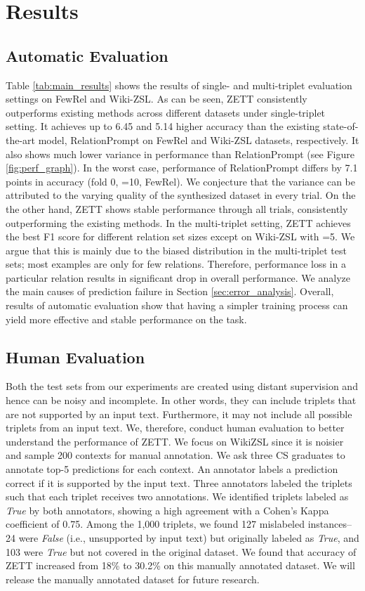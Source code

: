 \section{Results}
\subsection{Automatic Evaluation}
\label{sec:main_results}
Table \ref{tab:main_results} shows the results of single- and multi-triplet evaluation settings on FewRel and Wiki-ZSL. As can be seen, ZETT consistently outperforms existing methods across different datasets under single-triplet setting. It achieves up to 6.45 and 5.14 higher accuracy than the existing state-of-the-art model, RelationPrompt on FewRel and Wiki-ZSL datasets, respectively. It also shows much lower variance in performance than RelationPrompt (see Figure \ref{fig:perf_graph}). In  the worst case, performance of  RelationPrompt differs by 7.1 points in accuracy (fold 0, =10, FewRel). We conjecture that the variance can be attributed to the varying quality of the synthesized dataset in every trial. On the the other hand, ZETT shows stable performance through all trials, consistently outperforming the existing methods. In the multi-triplet setting, ZETT achieves the best F1 score for different relation set sizes except on Wiki-ZSL with =5. We argue that this is mainly due to the biased distribution in the multi-triplet test sets; most examples are only for few relations. Therefore, performance loss in a particular relation results in significant drop in overall performance. We analyze the main causes of prediction failure in Section \ref{sec:error_analysis}. Overall, results of automatic evaluation show that having a simpler training process can yield more effective and stable performance on the task. 

\subsection{Human Evaluation}
\label{sec:human_eval}
{Both the test sets from our experiments are created using distant supervision and hence can be noisy and incomplete. In other words, they can include triplets that are not supported by an input text. Furthermore, it may not include all possible triplets from an input text. We, therefore, conduct human evaluation to better understand the performance of ZETT. We focus on WikiZSL since it is noisier and sample 200 contexts for manual annotation. We ask three CS graduates to annotate top-5 predictions for each context. An annotator labels a prediction correct if it is supported by the input text.
Three annotators labeled the triplets such that each triplet receives two annotations. 
We identified triplets labeled as \textit{True} by both annotators, showing a high agreement with a Cohen's Kappa coefficient of 0.75. Among the 1,000 triplets, we found 127 mislabeled instances--24 were \textit{False} (i.e., unsupported by input text) but originally labeled as \textit{True}, and 103 were \textit{True} but not covered in the original dataset.
We found that accuracy of ZETT increased from 18\% to 30.2\% on this manually annotated dataset. We will release the manually annotated dataset for future research.}

